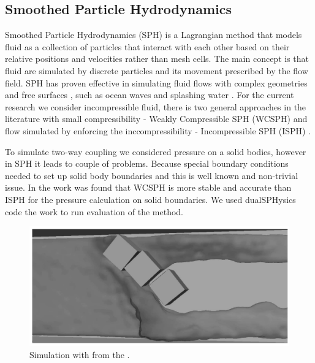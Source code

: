 \subsection{Smoothed Particle Hydrodynamics}
Smoothed Particle Hydrodynamics (SPH) is a Lagrangian method that models fluid as a collection of particles that interact with each other based on their relative positions and velocities rather than mesh cells. The main concept is that fluid are simulated by discrete particles and its movement prescribed by the flow field. SPH has proven effective in simulating fluid flows with complex geometries and free surfaces \cite{adami2012SPH}, such as ocean waves \cite{barreiro2013SPH} and splashing water \cite{moreira2020SPH}. For the current research we consider incompressible fluid, there is two general approaches in the literature with small compressibility - Weakly Compressible SPH (WCSPH)\cite{ren2015nonlinear} and flow simulated by enforcing the inccompressibility -  Incompressible SPH (ISPH) \cite{macia2012boundary}. 

To simulate two-way coupling we considered pressure on a solid bodies, however in SPH it leads to couple of problems. Because special boundary conditions needed to set up solid body boundaries and this is well known and non-trivial issue. In the work \cite{kopysov2015modeling} was found that WCSPH is more stable and accurate than ISPH for the pressure calculation on solid boundaries. We used dualSPHysics code \cite{Dual_SPH2019accuracy} the work \cite{kopysov2015modeling} to run evaluation of the method.

\begin{figure}[!ht]
    \centering
    \includegraphics[width=16cm]{GWU_Thesis_Sarmakeeva/Images/chap1/3_blocks_SPH.png}
    \caption{Simulation with \cite{Dual_SPH2019accuracy} from the \cite{sarmakeeva2017meshfree}.}
    \label{fig:3_blocks_SPH}
\end{figure}

